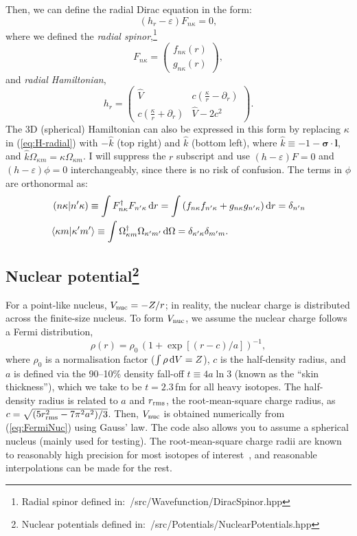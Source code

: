 \documentclass[10pt,twocolumn,a4paper]{article}%
\newcommand{\braket}[1]{\ensuremath{\langle #1\rangle}}	%
\newcommand{\matr}[4]{\ensuremath{\begin{pmatrix}#1&#2\\#3&#4\end{pmatrix}}}	%
\newcommand{\twocomp}[2]{\ensuremath{\begin{pmatrix}#1\\#2\end{pmatrix}}}	%
\renewcommand{\v}[1]{\ensuremath{\boldsymbol{#1}}}		%
\newcommand{\be}{\begin{equation}}
\newcommand{\ee}{\end{equation}}
\def\d{\ensuremath{{\rm d}}}
\def\en{\ensuremath{\varepsilon}}
\def\p{\ensuremath{\partial}}
\newcommand{\s}{\ensuremath{\sigma}}
\renewcommand{\k}{\ensuremath{\kappa}}
\begin{document}
Then, we can define the radial Dirac equation in the form: 
\be\label{eq:Dirac-radial}
\left(h_r - \en\right)F_{n\k} = 0,
\ee
where we defined the {\em radial spinor},\footnote{Radial spinor defined in:~/src/Wavefunction/DiracSpinor.hpp}
\be\label{eq:F-radial}
F_{n\k} =\twocomp {f_{n\k}(r)}{g_{n\k}(r)},
\ee
and {\em radial Hamiltonian},
\be\label{eq:H-radial}
h_r = \matr 	{\hat V} 				{c(\frac{\k}{r}-\p_r )}
			{c(\frac{\k}{r} + \p_r  )}	{\hat V-2c^2}.
\ee
The 3D (spherical) Hamiltonian can also be expressed in this form by replacing $\k$ in (\ref{eq:H-radial}) with $-\hat k$ (top right) and $\hat k$ (bottom left), where $\hat k \equiv -1 - \v{\s}\cdot\v{l}$,  and $\hat k\Omega_{\k m} = \k\Omega_{\k m}$.
I will suppress the $r$ subscript and use
$\left(h - \en\right)F = 0$ and $\left(h - \en\right)\phi = 0$ interchangeably, since there is no risk of confusion.
%
The terms in $\phi$ are orthonormal as: 
\begin{align}
&\left(n\k|n'\k\right)\equiv\int F_{n\k}^\dag F_{n'\k}\,\d r = \int\left(f_{n\k}f_{n'\k}+g_{n\k}g_{n'\k}\right)\d r = \delta_{n'n}\notag\\
\label{eq:ffrad}
&\braket{\k m|\k'm'}\equiv\int\Omega_{\k m}^\dag\Omega_{\k' m'}\,\d \Omega = \delta_{\k'\k}\delta_{m'm}.
\end{align}

\subsection[Nuclear potential]{Nuclear potential\footnote{Nuclear potentials defined in:~/src/Potentials/NuclearPotentials.hpp}}

 
For a point-like nucleus, $V_{\rm nuc} = -Z/r$;
in reality, the nuclear charge is distributed across the finite-size nucleus. 
To form $V_{\rm nuc}$, we assume the nuclear charge follows a Fermi distribution,
\begin{equation}\label{eq:FermiNuc}
\rho(r) = {\rho_0}\,{\left(1+\exp[(r-c)/a]\right)^{-1}},
\end{equation}
where $\rho_0$ is a normalisation factor ($\int\rho\,\d V = Z$), 
$c$ is the half-density radius, and 
$a$ is defined via the 90--10\% density fall-off {${t\equiv 4a\ln3}$} (known as the ``skin thickness''),
which we take to be $t=2.3$\,{\rm fm} for all heavy isotopes.
The half-density radius is related to $a$ and $r_{\rm rms}$, the root-mean-square charge radius, as $c = \sqrt{(5 r_{\rm rms}^2 -7\pi^2a^2)/3}$.
Then, $V_{\rm nuc}$ is obtained numerically from (\ref{eq:FermiNuc}) using Gauss' law.
The code also allows you to assume a spherical nucleus (mainly used for testing).
The root-mean-square charge radii are known to reasonably high precision for most isotopes of interest~\cite{Angeli2013}, and reasonable interpolations can be made for the rest.
\end{document}
